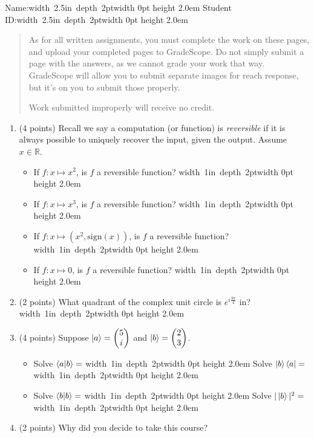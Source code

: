\documentclass[12pt]{article}
\newcommand{\Blank}{\mbox{\hskip 4pt\vrule width 1in depth 2pt}\vrule width 0pt height 2.0em}
\newcommand{\NameBlank}{\mbox{\hskip 4pt\vrule width 2.5in depth 2pt}\vrule width 0pt height 2.0em}
\begin{document}

\noindent Name:\NameBlank{}   Student ID:\NameBlank{} \newline

\begin{quote}
    As for all written assignments, you must complete the work on these pages, and upload your completed pages to GradeScope.  Do not simply submit a page with the answers, as we cannot grade your work that way.  GradeScope will allow you to submit separate images for reach response, but it's on you to submit those properly.

    Work submitted improperly will receive no credit.
\end{quote}

\begin{enumerate}[font=\bfseries]
    \item (4 points) Recall we say a computation (or function) is \emph{reversible} if it is always possible to uniquely recover the input, given the output. Assume $x \in \mathbb{R}$.
    \begin{itemize}
        \item If $f : x \mapsto x^2$, is $f$ a reversible function? \Blank{}
        \item If $f : x \mapsto x^3$, is $f$ a reversible function? \Blank{}
        \item If $f : x \mapsto (x^2,\textrm{sign}(x))$, is $f$ a reversible function? \Blank{}
        \item If $f : x \mapsto 0$, is $f$ a reversible function? \Blank{}
    \end{itemize}
    \item (2 points) What quadrant of the complex unit circle is $e^{i\frac{3\pi}{4}}$ in?\Blank{}
    \item (4 points) Suppose $\ket{a} = \begin{pmatrix}5 \\ i \end{pmatrix}$ and $\ket{b} = \begin{pmatrix}2 \\ 3 \end{pmatrix}$.\begin{itemize}
        \item Solve $\braket{a|b} = $ \Blank{} Solve $\ket{b}\bra{a} = $ \Blank{}
        \item Solve $\braket{b|b} = $ \Blank{} Solve $|\ket{b}|^2 = $ \Blank{}
    \end{itemize}
    \item (2 points) Why did you decide to take this course? \newline
    
\end{enumerate}
\end{document}
